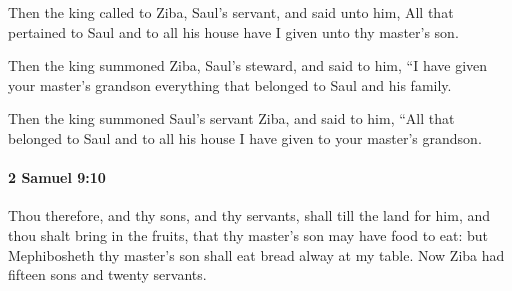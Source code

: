 			\begin{versebox}
					\item[BHS] 
					\item[ASV] Then the king called to Ziba, Saul's servant, and said unto him, All that pertained to Saul and to all his house have I given unto thy master's son.
					\item[NIV] Then the king summoned Ziba, Saul’s steward, and said to him, “I have given your master’s grandson everything that belonged to Saul and his family.
					\item[NRSV] Then the king summoned Saul’s servant Ziba, and said to him, “All that belonged to Saul and to all his house I have given to your master’s grandson.
			\end{versebox}

		\paragraph{2 Samuel 9:10} %
			\label{2SAMUEL-9-10}

			Thou therefore, and thy sons, and thy servants, shall till the land for him, and thou shalt bring in the fruits, that thy master’s son may have food to eat: but Mephibosheth thy master’s son shall eat bread alway at my table. Now Ziba had fifteen sons and twenty servants.

